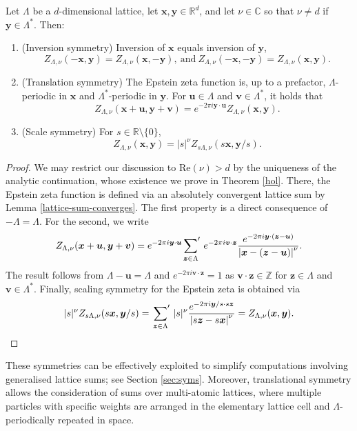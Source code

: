 \documentclass[]{amsart}
\newcommand{\new}[1]{#1}
\newcommand{\zeps}[3]{\new{Z_{#1} (#2, #3)}}
\newcommand{\sums}{\sideset{}{'} \sum}
\newcommand{\crandallreqs}{
Let \(\Lambda\) be a \(d\)-dimensional lattice,
let \(\bm x,\bm y\in\mathds{R}^d\), and let \(\nu\in\mathds C\)
so that \(\nu\neq d\) if \(\bm y\in\Lambda^{\ast}\). }
\numberwithin{mythm}{section}
\begin{document}
\begin{lemma}[Symmetries] 
\label{lem:syms}
\crandallreqs Then:
     \begin{enumerate}
\item (Inversion symmetry)  Inversion of $\bm x$ equals inversion of $\bm y$,
           \[\zeps{\Lambda, \nu}{-\bm x}{\bm y} = \zeps{\Lambda, \nu}{\bm x}{- \bm y},~ \text{and}~ \zeps{\Lambda, \nu}{-\bm x}{-\bm y} = \zeps{\Lambda, \nu}{\bm x}{\bm y}.\]
     \item (Translation symmetry) The Epstein zeta function is, up to a prefactor, $\Lambda$-periodic in $\bm x$ and $\Lambda^\ast$-periodic in $\bm y$. For $\bm u \in \Lambda$ and $\bm v \in \Lambda^*$, it holds that
     \[\zeps{\Lambda, \nu}{\bm x+\bm u}{\bm y+\bm v} = e^{-2 \pi i  \bm y \cdot \bm u} \zeps{\Lambda, \nu}{\bm x}{\bm y}.\]
     \item (Scale symmetry) For $s \in \mathds R\setminus\{0\}$,
    \[\zeps{\Lambda, \nu}{\bm x}{\bm y} = |s|^\nu \zeps{s \Lambda, \nu}{s \bm x}{\bm y / s}.\]
     \end{enumerate}
\end{lemma}

\begin{proof}
We may restrict our discussion to $\mathrm{Re}(\nu)>d$ by the uniqueness of the analytic continuation, whose existence we prove in Theorem \ref{hol}. There, the Epstein zeta function is defined via an absolutely convergent lattice sum by Lemma \ref{lattice-sum-converges}. 
The first property is a direct consequence of $-\Lambda=\Lambda$. For the second, we write
\[
    \zeps{\Lambda, \nu}{\bm x+\bm u}{\bm y+\bm v} = e^{-2\pi i \bm y\cdot \bm u}\sums_{\bm z \in \Lambda} \, 
    e^{-2\pi i \bm v \cdot \bm z}\frac{e^{-2\pi i \bm y \cdot (\bm z-\bm u)}}{\left|\bm x- (\bm z-\bm u)\right|^\nu}.
\]
The result follows from 
$\Lambda-\bm u = \Lambda$
and
$e^{-2\pi i \bm v \cdot \bm z} =1$ as $\bm v\cdot \bm z\in \mathds Z$ for $\bm z\in \Lambda$ and $\bm v\in \Lambda^\ast$. Finally, scaling symmetry for the Epstein zeta is obtained via
\[|s|^\nu \zeps{s \Lambda, \nu}{s \bm x}{\bm y / s}
= \sums_{\bm z \in \Lambda}\, |s|^\nu \frac{e^{-2 \pi i \bm y/s \cdot s \bm z}}{\left|s \bm z - s \bm x\right|^\nu} 
= \zeps{\Lambda, \nu}{\bm x}{\bm y}.
\qedhere
\]
\end{proof}

These symmetries can be effectively exploited to simplify computations involving generalised lattice sums; see Section \ref{sec:syms}.
Moreover, translational symmetry allows the consideration of sums over multi-atomic lattices,
where multiple particles with specific weights are arranged in the elementary lattice cell and $\Lambda$-periodically repeated in space.
\end{document}
